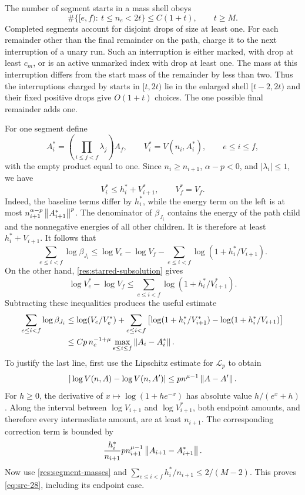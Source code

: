 The number of segment starts in a mass shell obeys
\begin{equation}
  \#\{[e,f):\ t\le n_e<2t\}\le C(1+t),\qquad t\ge M.
  \label{res:segment-shell-count}
\end{equation}
Completed segments account for disjoint drops of size at least one.
For each remainder other than the final remainder on the path,
charge it to the next interruption of a unary run.  Such an
interruption is either marked, with drop at least $c_m$, or is an
active unmarked index with drop at least one.  The mass at this
interruption differs from the start mass of the remainder by less
than two.  Thus the interruptions charged by starts in $[t,2t)$
lie in the enlarged shell $[t-2,2t)$ and their fixed positive drops
give $O(1+t)$ choices.  The one possible final remainder adds one.

For one segment define
\[
 A_i^*=\left(\prod_{i\le j<f}\lambda_j\right)A_f,
 \qquad V_i^*=V(n_i,A_i^*),\qquad e\le i\le f,
\]
with the empty product equal to one.  Since $n_i\ge n_{i+1}$,
$\alpha-p<0$, and $|\lambda_i|\le1$, we have
\begin{equation}
  V_i^*\le h_i^*+V_{i+1}^*,\qquad V_f^*=V_f.
  \label{res:starred-subsolution}
\end{equation}
Indeed, the baseline terms differ by $h_i^*$, while the energy
term on the left is at most
$n_{i+1}^{\alpha-p}\left\|A_{i+1}^*\right\|^p$.
The denominator of $\beta_{J_i}$ contains the energy of the path
child and the nonnegative energies of all other children.  It is
therefore at least $h_i^*+V_{i+1}$.  It follows that
\[
 \sum_{e\le i<f}\log\beta_{J_i}
 \le \log V_e-\log V_f
       -\sum_{e\le i<f}\log(1+h_i^*/V_{i+1}).
\]
On the other hand, \eqref{res:starred-subsolution} gives
\[
 \log V_e^*-\log V_f
       \le\sum_{e\le i<f}\log(1+h_i^*/V_{i+1}^*).
\]
Subtracting these inequalities produces the useful estimate
\begin{equation}
 \begin{aligned}
 \sum_{e\le i<f}\log\beta_{J_i}
 &\le \log(V_e/V_e^*)
       +\sum_{e\le i<f}
           \left[\log(1+h_i^*/V_{i+1}^*)
                 -\log(1+h_i^*/V_{i+1})\right] \\
 &\le Cp\, n_e^{-1+\mu}
            \max_{e\le i\le f}\left\|A_i-A_i^*\right\|.
 \end{aligned}
 \label{eq:src-28}
\end{equation}
To justify the last line, first use the Lipschitz estimate for
$\mathcal L_p$ to obtain
\[
  |\log V(n,A)-\log V(n,A')|
       \le p n^{\mu-1}\left\|A-A'\right\|.
\]
For $h\ge0$, the derivative of $x\mapsto\log(1+he^{-x})$ has
absolute value $h/(e^x+h)$.  Along the interval between
$\log V_{i+1}$ and $\log V_{i+1}^*$, both endpoint amounts, and
therefore every intermediate amount, are at least $n_{i+1}$.
The corresponding correction term is bounded by
\[
 \frac{h_i^*}{n_{i+1}}
      p n_{i+1}^{\mu-1}\left\|A_{i+1}-A_{i+1}^*\right\|.
\]
Now use \eqref{res:segment-masses} and
$\sum_{e\le i<f}h_i^*/n_{i+1}\le2/(M-2)$.  This proves
\eqref{eq:src-28}, including its endpoint case.

